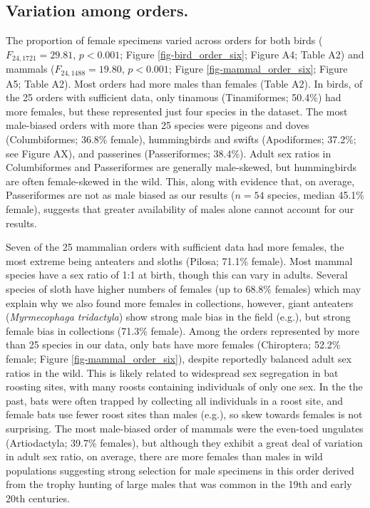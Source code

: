\documentclass[a4paper, 12pt]{article}
\begin{document}
\subsection{Variation among orders.} 
The proportion of female specimens varied across orders for both birds ($F_{24, 1721} = 29.81$, $p < 0.001$; Figure \ref{fig-bird_order_six}; Figure A4; Table A2) and mammals ($F_{24, 1488} = 19.80$, $p < 0.001$; Figure \ref{fig-mammal_order_six}; Figure A5; Table A2). 
Most orders had more males than females (Table A2). 
In birds, of the 25 orders with sufficient data, only tinamous (Tinamiformes; 50.4\%) had more females, but these represented just four species in the dataset. 
The most male-biased orders with more than 25 species were pigeons and doves (Columbiformes; 36.8\% female), hummingbirds and swifts (Apodiformes; 37.2\%; see Figure AX), and passerines (Passeriformes; 38.4\%). 
Adult sex ratios in Columbiformes and Passeriformes are generally male-skewed\cite{szekely2014sex,bosque2019skewed,mayr1939sex}, but hummingbirds are often female-skewed in the wild\cite{szekely2014sex,mayr1939sex}. 
This, along with evidence that, on average, Passeriformes are not as male biased as our results ($n = 54$ species, median 45.1\% female\cite{szekely2014sex}), suggests that greater availability of males alone cannot account for our results.

Seven of the 25 mammalian orders with sufficient data had more females, the most extreme being anteaters and sloths (Pilosa; 71.1\% female). 
Most mammal species have a sex ratio of 1:1 at birth\cite{karlin1986theoretical}, though this can vary in adults. 
Several species of sloth have higher numbers of females (up to 68.8\% females\cite{reyes2015informacion}) which may explain why we also found more females in collections, however, giant anteaters (\textit{Myrmecophaga tridactyla}) show strong male bias in the field (e.g.\cite{defreitas2015}), but strong female bias in collections (71.3\% female). 
Among the orders represented by more than 25 species in our data, only bats have more females (Chiroptera; 52.2\% female; Figure \ref{fig-mammal_order_six}), despite reportedly balanced adult sex ratios in the wild\cite{altringham}. 
This is likely related to widespread sex segregation in bat roosting sites, with many roosts containing individuals of only one sex\cite{altringham}. 
In the the past, bats were often trapped by collecting all individuals in a roost site, and female bats use fewer roost sites than males (e.g.\cite{encarnaccao2012spatiotemporal}), so skew towards females is not surprising. 
The most male-biased order of mammals were the even-toed ungulates (Artiodactyla; 39.7\% females), but although they exhibit a great deal of variation in adult sex ratio, on average, there are more females than males in wild populations\cite{berger1999sex} suggesting strong selection for male specimens in this order derived from the trophy hunting of large males that was common in the 19th and early 20th centuries.
\end{document}
